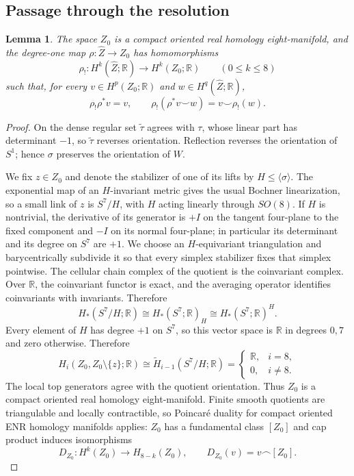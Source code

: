 \documentclass[11pt]{article}
\newtheorem{lemma}[theorem]{Lemma}
\theoremstyle{remark}\newtheorem{remark}[theorem]{Remark}
\newcommand{\R}{\mathbb R}
\begin{document}
\subsection{Passage through the resolution}
\begin{lemma}\label{lem:Gysin}
The space $Z_0$ is a compact oriented real homology eight-manifold, and the
degree-one map $\rho:\widehat Z\to Z_0$ has homomorphisms
\[
\rho_!:H^k(\widehat Z;\R)\longrightarrow H^k(Z_0;\R)
\qquad(0\leq k\leq8)
\]
such that, for every $v\in H^p(Z_0;\R)$ and
$w\in H^q(\widehat Z;\R)$,
\begin{equation}\label{eq:Gysin-properties}
\rho_!\rho^*v=v,\qquad
\rho_!(\rho^*v\smile w)=v\smile\rho_!(w).
\end{equation}
\end{lemma}
\begin{proof}
On the dense regular set $\widetilde\tau$ agrees with $\tau$, whose linear
part has determinant $-1$, so $\widetilde\tau$ reverses orientation.
Reflection reverses the orientation of $S^1$; hence $\sigma$ preserves the
orientation of $W$.

We fix $z\in Z_0$ and denote the stabilizer of one of its lifts by
$H\le\langle\sigma\rangle$.  The exponential map of an $H$-invariant metric gives the usual
Bochner linearization, so a small link of $z$ is $S^7/H$, with $H$ acting
linearly through $SO(8)$.  If $H$ is nontrivial, the derivative of its
generator is $+I$ on the tangent four-plane to the fixed component and
$-I$ on its normal four-plane; in particular its determinant and its degree
on $S^7$ are $+1$.  We choose an $H$-equivariant triangulation
\cite{Illman} and barycentrically subdivide it so that every simplex
stabilizer fixes that simplex pointwise.  The cellular chain complex of
the quotient is the coinvariant complex.  Over $\R$, the coinvariant
functor is exact, and the averaging operator identifies coinvariants with
invariants.  Therefore
\[
 H_*(S^7/H;\R)\cong H_*(S^7;\R)_H
 \cong H_*(S^7;\R)^H.
\]
Every element of $H$ has degree $+1$ on $S^7$, so this vector space is
$\R$ in degrees $0,7$ and zero otherwise.  Therefore
\begin{equation}\label{eq:local-homology}
H_i(Z_0,Z_0\setminus\{z\};\R)
\cong\widetilde H_{i-1}(S^7/H;\R)
=\begin{cases}\R,&i=8,\\0,&i\ne8.\end{cases}
\end{equation}
The local top generators agree with the quotient orientation.  Thus $Z_0$
is a compact oriented real homology eight-manifold.  Finite smooth
quotients are triangulable and locally contractible, so Poincar\'e duality
for compact oriented ENR homology manifolds
\cite[Chapter V]{BredonSheaf} applies: $Z_0$ has a
fundamental class $[Z_0]$ and cap product induces isomorphisms
\begin{equation}\label{eq:PD-homology-manifold}
 D_{Z_0}:H^k(Z_0)\longrightarrow H_{8-k}(Z_0),\qquad
 D_{Z_0}(v)=v\frown[Z_0].
\end{equation}


\end{proof}
\end{document}
